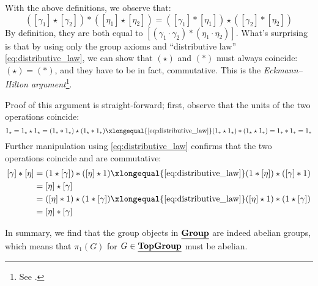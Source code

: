\documentclass[a4paper,10pt]{article}
\begin{document}
\begin{enumerate}
	With the above definitions, we observe that:
	\begin{equation}
		([\gamma_1]\star[\gamma_2])
		* ([\eta_1]\star[\eta_2])
		= ([\gamma_1]*[\eta_1])
		\star ([\gamma_2]*[\eta_2])
		\label{eq:distributive_law}
	\end{equation}
	By definition, they are both equal to $
		[(\gamma_1\cdot\gamma_2)*(\eta_1\cdot\eta_2)]
	$. What's surprising is that by using only the group axioms and ``distributive law'' \eqref{eq:distributive_law}, we can show that $(\star)$ and $(*)$ must always coincide: $(\star) = (*)$, and they have to be in fact, commutative. This is the \textit{Eckmann–Hilton argument}\footnote{
		See . 
	}. 
	
	Proof of this argument is straight-forward; first, observe that the units of the two operations coincide:
	\begin{equation}
		1_{\star}
		= 1_{\star}\star 1_{\star}
		= (1_{*} * 1_{\star})
			\star (1_{\star} * 1_{*})
		\xlongequal{\eqref{eq:distributive_law}}
			(1_{*}\star 1_{\star})
			* (1_{\star}\star 1_{*})
		= 1_{*} * 1_{*}
		= 1_{*}
	\end{equation}
	Further manipulation using \eqref{eq:distributive_law} confirms that the two operations coincide and are commutative:
	\begin{align}
	\begin{aligned}
		[\gamma] * [\eta]
		&= (1\star [\gamma]) * ([\eta]\star 1)
		\xlongequal{\eqref{eq:distributive_law}}
			(1 * [\eta])\star ([\gamma] * 1) \\
		&= [\eta]\star [\gamma] \\
		&= ([\eta] * 1)\star (1 * [\gamma])
		\xlongequal{\eqref{eq:distributive_law}}
			([\eta]\star 1) * (1\star [\gamma]) \\
		&= [\eta] * [\gamma]
	\end{aligned}
	\end{align}
	
	In summary, we find that the group objects in $\underline{\mathbf{Group}}$ are indeed abelian groups, which means that $\pi_1(G)$ for $G\in\underline{\mathbf{TopGroup}}$ must be abelian. \qedfull
	
	\end{enumerate}

\printbibliography[%
	title = {参考文献} %
	,heading = bibintoc
]
\end{document}
